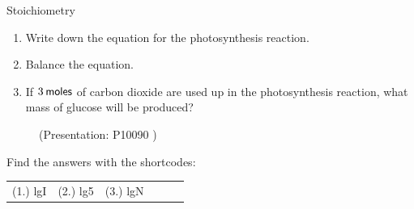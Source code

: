 \begin{exercises}{  Stoichiometry
      }
\begin{enumerate}[noitemsep, label=\textbf{\arabic*}. ]
\begin{enumerate}[noitemsep, label=\textbf{\alph*}. ]
            \label{m38712*uid104}\item Write down the equation for the photosynthesis reaction.
\label{m38712*uid105}\item Balance the equation.
\label{m38712*uid106}\item If $3\phantom{\rule{2pt}{0ex}}\mathsf{moles}$ of carbon dioxide are used up in the photosynthesis reaction, what mass of glucose will be produced?
\end{enumerate}
                \end{enumerate}
    \label{m38712*eip-269}
    \setcounter{subfigure}{0}
	\begin{figure}[H] %
    \label{m38712*slidesharemedia}\label{m38712*slideshareflash}
             { (Presentation:  P10090 )}
      \vspace{2pt}
    \vspace{.1in}
 \end{figure}       \par \label{m38712*cid10}
\par {} Find the answers with the shortcodes:
 \par \begin{tabular}[h]{cccccc}
 (1.) lgI  &  (2.) lg5  &  (3.) lgN  & \end{tabular}
\end{exercises}
